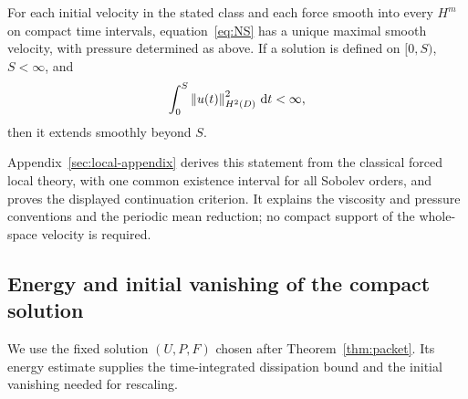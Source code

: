 \begin{proposition}
\label{prop:local}\label{lem:Rlocal}
For each initial velocity in the stated class and each force smooth into
every $H^m$ on compact time intervals, equation~\eqref{eq:NS} has a unique
maximal smooth velocity, with pressure determined as above. If a solution
is defined on $[0,S)$, $S<\infty$, and
\begin{equation}\label{eq:criterion}
 \int_0^S\left\lVert u(t)\right\rVert_{H^2(D)}^2\,\mathrm d t<\infty,
\end{equation}
then it extends smoothly beyond $S$.
\end{proposition}
Appendix~\ref{sec:local-appendix} derives this statement from the classical
forced local theory, with one common existence interval for all Sobolev
orders, and proves the displayed continuation criterion. It explains
the viscosity and pressure conventions and the periodic mean reduction;
no compact support of the whole-space velocity is required.

\subsection{Energy and initial vanishing of the compact solution}
We use the fixed solution $(U,P,F)$ chosen after
Theorem~\ref{thm:packet}. Its energy estimate supplies the time-integrated
dissipation bound and the initial vanishing needed for rescaling.

